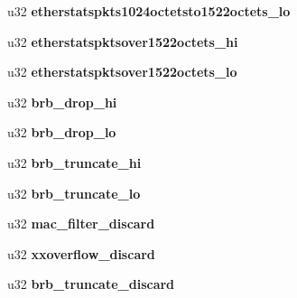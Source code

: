 \begin{DoxyCompactItemize}
\item 
\hypertarget{structbnx2x__eth__stats_a6d41489d7974ef7046908cd10e378cf7}{
u32 {\bfseries etherstatspkts1024octetsto1522octets\_\-lo}}
\label{structbnx2x__eth__stats_a6d41489d7974ef7046908cd10e378cf7}

\item 
\hypertarget{structbnx2x__eth__stats_ad0c8630e135c8d23c584df18bf0f67bf}{
u32 {\bfseries etherstatspktsover1522octets\_\-hi}}
\label{structbnx2x__eth__stats_ad0c8630e135c8d23c584df18bf0f67bf}

\item 
\hypertarget{structbnx2x__eth__stats_a5804ea2cf6719c15c150c28b52b03c43}{
u32 {\bfseries etherstatspktsover1522octets\_\-lo}}
\label{structbnx2x__eth__stats_a5804ea2cf6719c15c150c28b52b03c43}

\item 
\hypertarget{structbnx2x__eth__stats_a2b786b136467984668e12ca9f92d2268}{
u32 {\bfseries brb\_\-drop\_\-hi}}
\label{structbnx2x__eth__stats_a2b786b136467984668e12ca9f92d2268}

\item 
\hypertarget{structbnx2x__eth__stats_a743d77e4b4dea98a24bc61b531f0b51e}{
u32 {\bfseries brb\_\-drop\_\-lo}}
\label{structbnx2x__eth__stats_a743d77e4b4dea98a24bc61b531f0b51e}

\item 
\hypertarget{structbnx2x__eth__stats_aa5d917bda47f04c3f2c78ae9be064b56}{
u32 {\bfseries brb\_\-truncate\_\-hi}}
\label{structbnx2x__eth__stats_aa5d917bda47f04c3f2c78ae9be064b56}

\item 
\hypertarget{structbnx2x__eth__stats_afaebf7aea4012ef28feecb5f43137637}{
u32 {\bfseries brb\_\-truncate\_\-lo}}
\label{structbnx2x__eth__stats_afaebf7aea4012ef28feecb5f43137637}

\item 
\hypertarget{structbnx2x__eth__stats_a9059030d98435a338c6b482a508e1f2e}{
u32 {\bfseries mac\_\-filter\_\-discard}}
\label{structbnx2x__eth__stats_a9059030d98435a338c6b482a508e1f2e}

\item 
\hypertarget{structbnx2x__eth__stats_a0e54b0c254f0c96b938ffa9e35094669}{
u32 {\bfseries xxoverflow\_\-discard}}
\label{structbnx2x__eth__stats_a0e54b0c254f0c96b938ffa9e35094669}

\item 
\hypertarget{structbnx2x__eth__stats_acf950221b1cffe2f9c08856f8db8f5c9}{
u32 {\bfseries brb\_\-truncate\_\-discard}}
\label{structbnx2x__eth__stats_acf950221b1cffe2f9c08856f8db8f5c9}


\end{DoxyCompactItemize}
